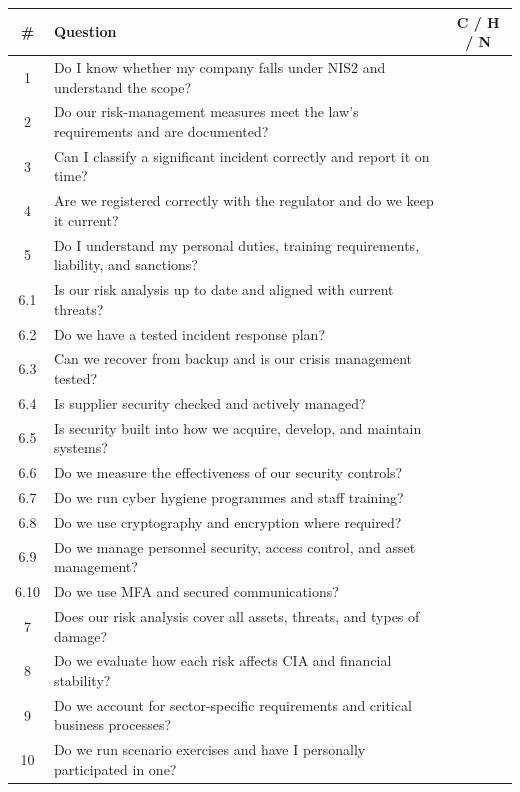 \documentclass[11pt,a4paper,twoside]{book}
\begin{document}
\begin{center}
\renewcommand{\arraystretch}{1.4}
\begin{tabularx}{\linewidth}{@{}cXc@{}}
\toprule
\textbf{\#} & \textbf{Question} & \textbf{C / H / N} \\
\midrule
1 & Do I know whether my company falls under NIS2 and understand the scope? & \\
2 & Do our risk-management measures meet the law's requirements and are documented? & \\
3 & Can I classify a significant incident correctly and report it on time? & \\
4 & Are we registered correctly with the regulator and do we keep it current? & \\
5 & Do I understand my personal duties, training requirements, liability, and sanctions? & \\
6.1 & Is our risk analysis up to date and aligned with current threats? & \\
6.2 & Do we have a tested incident response plan? & \\
6.3 & Can we recover from backup and is our crisis management tested? & \\
6.4 & Is supplier security checked and actively managed? & \\
6.5 & Is security built into how we acquire, develop, and maintain systems? & \\
6.6 & Do we measure the effectiveness of our security controls? & \\
6.7 & Do we run cyber hygiene programmes and staff training? & \\
6.8 & Do we use cryptography and encryption where required? & \\
6.9 & Do we manage personnel security, access control, and asset management? & \\
6.10 & Do we use MFA and secured communications? & \\
7 & Does our risk analysis cover all assets, threats, and types of damage? & \\
8 & Do we evaluate how each risk affects CIA and financial stability? & \\
9 & Do we account for sector-specific requirements and critical business processes? & \\
10 & Do we run scenario exercises and have I personally participated in one? & \\
\bottomrule
\end{tabularx}
\end{center}
\end{document}
